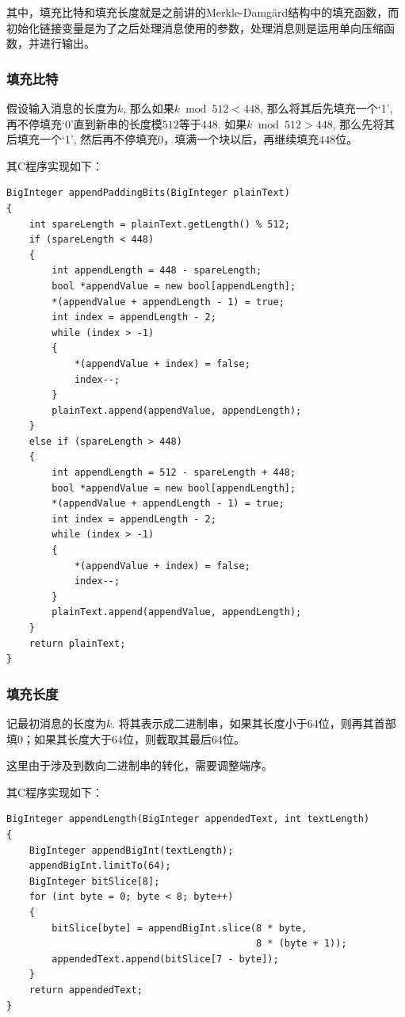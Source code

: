 其中，填充比特和填充长度就是之前讲的Merkle-Damg\aa rd结构中的填充函数，而初始化链接变量是为了之后处理消息使用的参数，处理消息则是运用单向压缩函数，并进行输出。
\subsubsection{填充比特}
假设输入消息的长度为$k$, 那么如果$k\bmod{512}<448$, 那么将其后先填充一个`1', 再不停填充`0'直到新串的长度模$512$等于$448$. 如果$k\bmod{512}>448$, 那么先将其后填充一个`1', 然后再不停填充0，填满一个块以后，再继续填充$448$位。\par
其C程序实现如下：
\begin{prove}
\begin{verbatim}
BigInteger appendPaddingBits(BigInteger plainText)
{
    int spareLength = plainText.getLength() % 512;
    if (spareLength < 448)
    {
        int appendLength = 448 - spareLength;
        bool *appendValue = new bool[appendLength];
        *(appendValue + appendLength - 1) = true;
        int index = appendLength - 2;
        while (index > -1)
        {
            *(appendValue + index) = false;
            index--;
        }
        plainText.append(appendValue, appendLength);
    }
    else if (spareLength > 448)
    {
        int appendLength = 512 - spareLength + 448;
        bool *appendValue = new bool[appendLength];
        *(appendValue + appendLength - 1) = true;
        int index = appendLength - 2;
        while (index > -1)
        {
            *(appendValue + index) = false;
            index--;
        }
        plainText.append(appendValue, appendLength);
    }
    return plainText;
}
\end{verbatim}
\end{prove}
\subsubsection{填充长度}
记最初消息的长度为$k$. 将其表示成二进制串，如果其长度小于64位，则再其首部填0；如果其长度大于64位，则截取其最后64位。\par
这里由于涉及到数向二进制串的转化，需要调整端序。\par
其C程序实现如下：
\begin{prove}
\begin{verbatim}
BigInteger appendLength(BigInteger appendedText, int textLength)
{
    BigInteger appendBigInt(textLength);
    appendBigInt.limitTo(64);
    BigInteger bitSlice[8];
    for (int byte = 0; byte < 8; byte++)
    {
        bitSlice[byte] = appendBigInt.slice(8 * byte, 
                                            8 * (byte + 1));
        appendedText.append(bitSlice[7 - byte]);
    }
    return appendedText;
}
\end{verbatim}
\end{prove}
